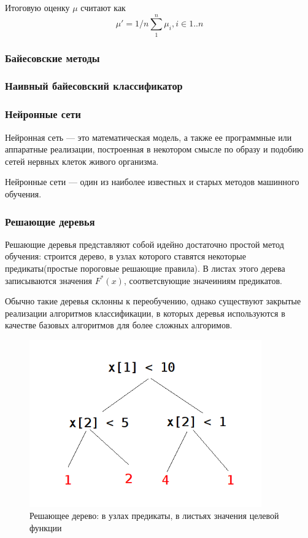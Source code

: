 Итоговую оценку $\mu$ считают как
\begin{equation}
\mu' = 1/n\sum_1^n{\mu_i}, i \in 1..n
\end{equation}

\subsubsection{Байесовские методы}
\subsubsection{Наивный байесовский классификатор}
\subsubsection{Нейронные сети}
Нейронная сеть — это математическая модель, а также ее программные или аппаратные реализации, построенная в некотором смысле по образу и подобию сетей нервных клеток живого организма.

Нейронные сети — один из наиболее известных и старых методов машинного обучения.

\subsubsection{Решающие деревья}
Решающие деревья представляют собой идейно достаточно простой метод обучения: строится дерево, в узлах которого ставятся некоторые предикаты(простые пороговые решающие правила). В листах этого дерева записываются значения $F^*(x)$, соответсвующие значеиниям предикатов.

Обычно такие деревья склонны к переобучению, однако существуют закрытые реализации алгоритмов классификации, в которых деревья используются в качестве базовых алгоритмов для более сложных алгоримов.
\begin{figure}[h]
\begin{center}
\includegraphics[width=10cm]{img/d_tree}
\end{center}
\caption{Решающее дерево: в узлах предикаты, в листьях значения целевой функции}
\label{d_tree}
\end{figure}

